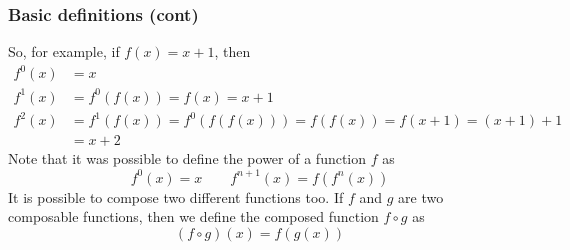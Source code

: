 %
\begin{frame}
\frametitle{Basic definitions (cont)}

So, for example, if \(f(x) = x + 1\), then
\begin{align*}
f^0(x) &= x\\
f^1(x) &= f^0(f(x)) = f(x) = x + 1\\
f^2(x) &= f^1(f(x)) = f^0(f(f(x))) = f(f(x)) = f(x+1) = (x + 1) + 1\\
       &= x + 2
\end{align*}
Note that it was possible to define the power of a function \(f\) as
\[
f^0(x) = x \qquad f^{n+1}(x) = f(f^{n}(x))
\]
It is possible to compose two different functions too. If \(f\) and
\(g\) are two composable functions, then we define the composed
function \(f \circ g\) as
\[
(f \circ g)(x) = f(g(x))
\]

\end{frame}
